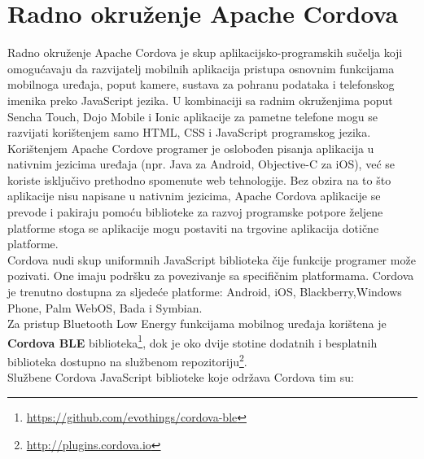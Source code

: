 \chapter{Radno okruženje Apache Cordova}
\label{chap:radnoOkruzenje}

Radno okruženje Apache Cordova je skup aplikacijsko-programskih sučelja  koji omogućavaju da razvijatelj mobilnih aplikacija pristupa osnovnim funkcijama mobilnoga uređaja, poput kamere, sustava za pohranu podataka i telefonskog imenika preko JavaScript jezika. 
U kombinaciji sa radnim okruženjima poput Sencha Touch, Dojo Mobile i Ionic aplikacije za pametne telefone mogu se razvijati korištenjem samo HTML, CSS i JavaScript programskog jezika.
\\

Korištenjem Apache Cordove programer je oslobođen pisanja aplikacija u nativnim jezicima uređaja (npr. Java za Android, Objective-C za iOS), već se koriste isključivo prethodno spomenute web tehnologije. 
Bez obzira na to što aplikacije nisu napisane u nativnim jezicima, Apache Cordova aplikacije se prevode i pakiraju pomoću biblioteke za razvoj programske potpore  željene platforme stoga se aplikacije mogu postaviti na trgovine aplikacija  dotične platforme. 
\\

Cordova nudi skup uniformnih JavaScript biblioteka čije funkcije programer može pozivati. 
One imaju podršku za povezivanje sa specifičnim platformama. Cordova je trenutno dostupna za sljedeće platforme: Android, iOS, Blackberry,Windows Phone, Palm WebOS, Bada i Symbian.
\\

Za pristup Bluetooth Low Energy funkcijama mobilnog uređaja korištena je \textbf{Cordova BLE} biblioteka\footnote{\url{https://github.com/evothings/cordova-ble}}, dok je oko dvije stotine dodatnih i besplatnih biblioteka dostupno na službenom repozitoriju\footnote{\url{http://plugins.cordova.io}}.
\\
Službene Cordova JavaScript biblioteke koje održava Cordova tim su:

